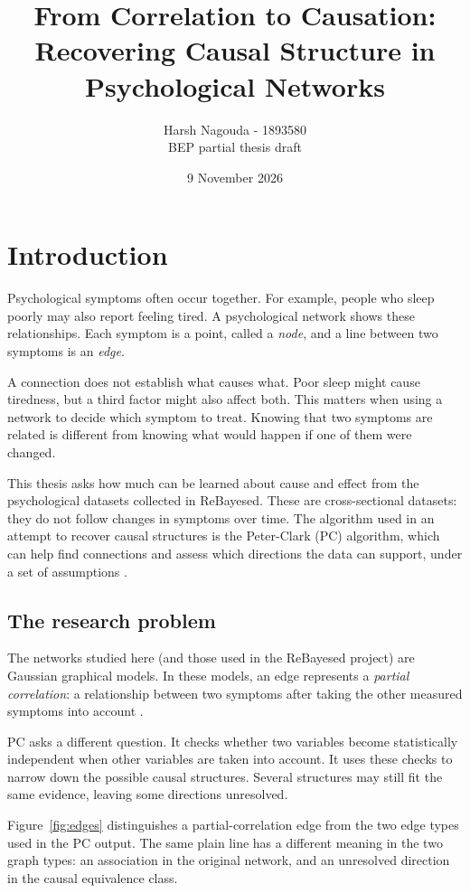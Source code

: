 \documentclass[11pt,a4paper]{article}
\title{From Correlation to Causation: Recovering Causal Structure in Psychological Networks}
\author{Harsh Nagouda - 1893580\\ \small BEP partial thesis draft}
\date{9 November 2026}
\begin{document}
\maketitle

\section{Introduction}
Psychological symptoms often occur together. For example, people who sleep poorly may also report feeling tired. A psychological network shows these relationships. Each symptom is a point, called a \emph{node}, and a line between two symptoms is an \emph{edge}.

A connection does not establish what causes what. Poor sleep might cause tiredness, but a third factor might also affect both. This matters when using a network to decide which symptom to treat. Knowing that two symptoms are related is different from knowing what would happen if one of them were changed.

This thesis asks how much can be learned about cause and effect from the psychological datasets collected in ReBayesed. These are cross-sectional datasets: they do not follow changes in symptoms over time. The algorithm used in an attempt to recover causal structures is the Peter-Clark (PC) algorithm, which can help find connections and assess which directions the data can support, under a set of assumptions \citep{spirtes1993,kalisch2007}.

\subsection{The research problem}
The networks studied here (and those used in the ReBayesed project) are Gaussian graphical models. In these models, an edge represents a \emph{partial correlation}: a relationship between two symptoms after taking the other measured symptoms into account \citep{borsboom2013}.

PC asks a different question. It checks whether two variables become statistically independent when other variables are taken into account. It uses these checks to narrow down the possible causal structures. Several structures may still fit the same evidence, leaving some directions unresolved.

Figure~\ref{fig:edges} distinguishes a partial-correlation edge from the two edge types used in the PC output. The same plain line has a different meaning in the two graph types: an association in the original network, and an unresolved direction in the causal equivalence class.
\end{document}
